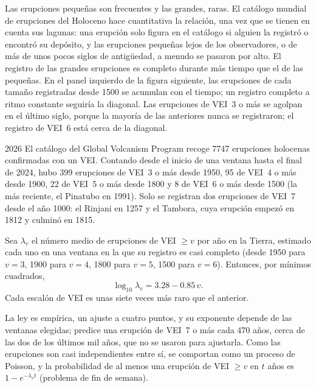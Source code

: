 Las erupciones pequeñas son frecuentes y las grandes, raras. El catálogo mundial de
erupciones del Holoceno hace cuantitativa la relación, una vez que se tienen en cuenta sus
lagunas: una erupción solo figura en el catálogo si alguien la registró o encontró su
depósito, y las erupciones pequeñas lejos de los observadores, o de más de unos pocos siglos de
antigüedad, a menudo se pasaron por alto. El registro de las grandes erupciones es completo durante más tiempo que
el de las pequeñas. En el panel izquierdo de la figura siguiente, las erupciones de cada
tamaño registradas desde 1500 se acumulan con el tiempo; un registro completo a ritmo
constante seguiría la diagonal. Las erupciones de VEI~3 o más se agolpan en el último
siglo, porque la mayoría de las anteriores nunca se registraron; el registro de VEI~6
está cerca de la diagonal.

\begin{dated}{2026}
El catálogo del Global Volcanism Program recoge \num{7747} erupciones holocenas confirmadas
con un VEI. Contando desde el inicio de una ventana hasta el final de 2024, hubo
399 erupciones de VEI~3 o más desde 1950, 95 de VEI~4 o más desde 1900,
22 de VEI~5 o más desde 1800 y 8 de VEI~6 o más desde 1500 (la más
reciente, el Pinatubo en 1991). Solo se registran dos erupciones de VEI~7 desde el año
1000: el Rinjani en 1257 y el Tambora, cuya erupción empezó en 1812 y culminó en
1815.
\end{dated}

\begin{proposition}\label{prop:b2:eruptive-styles:frequency}
Sea $\lambda_v$ el número medio de erupciones de VEI $\ge v$ por año en la Tierra,
estimado cada uno en una ventana en la que su registro es casi completo (desde 1950
para $v = 3$, 1900 para $v = 4$, 1800 para $v = 5$, 1500 para $v = 6$). Entonces, por mínimos
cuadrados,
\[
\log_{10}\lambda_v = 3.28 - 0.85\,v .
\]
Cada escalón de VEI es unas siete veces más raro que el anterior.
\end{proposition}

La ley es empírica, un ajuste a cuatro puntos, y su exponente depende de las
ventanas elegidas; predice una erupción de VEI~7 o más cada \num{470} años,
cerca de las dos de los últimos mil años, que no se usaron para ajustarla. Como
las erupciones son casi independientes entre sí, se comportan como un proceso
de Poisson, y la probabilidad de al menos una erupción de VEI $\ge v$ en $t$ años
es $1 - e^{-\lambda_vt}$ (problema de fin de semana).


